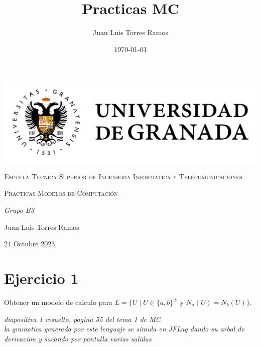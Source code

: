 \documentclass{article}
\title{Practicas MC}
\date{\today}
\author{Juan Luis Torres Ramos}
\begin{document}
        

        \begin{titlepage}
            \centering
            {\includegraphics[width=1\textwidth]{./Imagenes/logo_universidad_de_granada.png}\par}
            \vspace{1cm}
            {\scshape\Large Escuela Tecnica Superior de Ingenieria Informatica y Telecomunicaciones \par}
            \vspace{2.5cm}
            {\scshape\Huge Practicas Modelos de Computación \par}
            \vspace{1cm}
            {\itshape\Large  Grupo B3 \par} 
            \vfill
            {\Large Juan Luis Torres Ramos \par}
            \vspace{0.5cm}
            {\large 24 Octubre 2023 \par}
        \end{titlepage}



        \section*{Ejercicio 1}
            Obtener un modelo de calculo para $L = \{ U \mid U \in \{a, b\}^{\pm} \text{ y } N_a(U) = N_b(U) \}$.
        
            \vspace{\baselineskip} %

            \textit{
            diapositiva 1 resuelto, pagina 55 del tema 1 de MC\\
            la gramatica generada por este lenguaje se simula en JFLag dando su arbol de derivacion y sacando por pantalla varias salidas
            }
        \newpage
\end{document}
